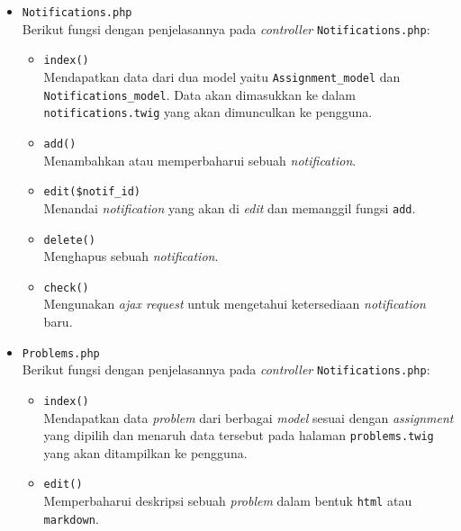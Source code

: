 \begin{itemize}
      \item \verb|Notifications.php| \\
            Berikut fungsi dengan penjelasannya pada \textit{controller} \verb|Notifications.php|:

            \begin{itemize}
                  \item \verb|index()| \\
                        Mendapatkan data dari dua model yaitu \verb|Assignment_model| dan \verb|Notifications_model|. Data akan dimasukkan ke dalam \verb|notifications.twig| yang akan dimunculkan ke pengguna.
                  \item \verb|add()| \\
                        Menambahkan atau memperbaharui sebuah \textit{notification}.
                  \item \verb|edit($notif_id)| \\
                        Menandai \textit{notification} yang akan di \textit{edit} dan memanggil fungsi \verb|add|.
                  \item \verb|delete()| \\
                        Menghapus sebuah \textit{notification}.
                  \item \verb|check()| \\
                        Mengunakan \textit{ajax request} untuk mengetahui ketersediaan \textit{notification} baru.
            \end{itemize}

      \item \verb|Problems.php| \\
            Berikut fungsi dengan penjelasannya pada \textit{controller} \verb|Notifications.php|:

            \begin{itemize}
                  \item \verb|index()| \\
                        Mendapatkan data \textit{problem} dari berbagai \textit{model} sesuai dengan \textit{assignment} yang dipilih dan menaruh data tersebut pada halaman \verb|problems.twig| yang akan ditampilkan ke pengguna.
                  \item \verb|edit()| \\
                        Memperbaharui deskripsi sebuah \textit{problem} dalam bentuk \verb|html| atau \verb|markdown|.
            \end{itemize}


\end{itemize}
